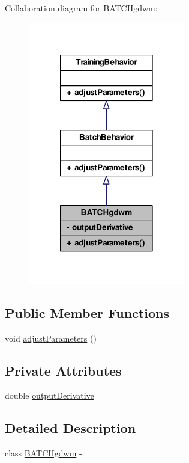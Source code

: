 Collaboration diagram for BATCHgdwm:\nopagebreak
\begin{figure}[H]
\begin{center}
\leavevmode
\includegraphics[width=194pt]{class_b_a_t_c_hgdwm__coll__graph}
\end{center}
\end{figure}
\subsection*{Public Member Functions}
\begin{DoxyCompactItemize}
\item 
void \hyperlink{class_b_a_t_c_hgdwm_af53c2c70dcef41328bb405f2905fd2c9}{adjustParameters} ()
\end{DoxyCompactItemize}
\subsection*{Private Attributes}
\begin{DoxyCompactItemize}
\item 
double \hyperlink{class_b_a_t_c_hgdwm_af22fdd2215a316dfe0739d377fcb87a8}{outputDerivative}
\end{DoxyCompactItemize}


\subsection{Detailed Description}
class \hyperlink{class_b_a_t_c_hgdwm}{BATCHgdwm} -\/ 

